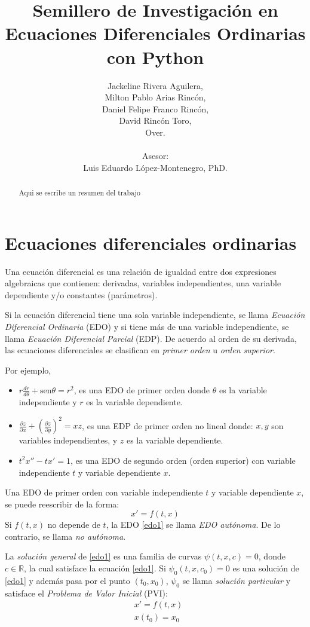 \documentclass[12pt,letterpaper]{article}
\title{Semillero de Investigación en Ecuaciones Diferenciales Ordinarias con Python}
\author{Jackeline Rivera Aguilera,\\
Milton Pablo Arias Rincón, \\
Daniel Felipe Franco Rincón,\\
David Rincón Toro,\\
Over.
\\\\
Asesor:\\
Luis Eduardo López-Montenegro, PhD.
}
\date{}
\newcommand{\R}{\mathds{R}}
\newcommand{\sen}{\text{sen}}
\begin{document}
\maketitle
\begin{abstract}
 Aqui se escribe un resumen del trabajo  
\end{abstract}

\section{Ecuaciones diferenciales ordinarias}
Una ecuación diferencial es una relación de igualdad entre dos expresiones algebraicas que contienen: derivadas, variables independientes, una variable dependiente y/o constantes (parámetros).

Si la ecuación diferencial tiene una sola variable independiente, se llama {\it Ecuación Diferencial Ordinaria} (EDO) y si tiene más de una variable independiente, se llama {\it Ecuación Diferencial Parcial} (EDP). De acuerdo al orden de su derivada, las ecuaciones diferenciales se clasifican en {\it primer orden} u {\it orden superior}.

Por ejemplo, 
\begin{itemize}
    \item $\displaystyle r \frac{dr}{d\theta} + \sen \theta = r^2 $, es una EDO de primer orden donde $\theta$ es la variable independiente y $r$ es la variable dependiente.
    \item $\displaystyle \frac{\partial z}{\partial x} + \left(\frac{\partial z}{\partial y}\right)^2=xz$, es una EDP de primer orden no lineal donde: $x,y$ son variables independientes, y $z$ es la variable dependiente.
    \item $t^2 x'' - tx' = 1$, es una EDO de segundo orden (orden superior) con variable independiente $t$ y variable dependiente $x$.
\end{itemize}

Una EDO de primer orden con variable independiente $t$ y variable dependiente $x$, se puede reescribir de la forma:
\begin{equation}\label{edo1}
    x'=f(t,x)
\end{equation}
Si $f(t,x)$ no depende de $t$, la EDO \eqref{edo1} se llama {\it EDO autónoma}. De lo contrario, se llama {\it no autónoma}.

La {\it solución general} de \eqref{edo1} es una familia de curvas $\psi(t,x,c)=0$, donde $c\in\R$, la cual satisface la ecuación \eqref{edo1}. Si $\psi_0(t,x,c_0)=0$ es una solución de \eqref{edo1} y además pasa por el punto $(t_0,x_0)$, $\psi_0$ se llama {\it solución particular} y satisface el {\it Problema de Valor Inicial} (PVI):
\begin{align}\label{pvi}
    & x'=f(t,x)\\ \nonumber
    & x(t_0)=x_0 
\end{align}
\end{document}
